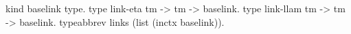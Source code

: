 \begin{elpicode}
  kind baselink type.
  type link-eta  tm -> tm -> baselink.
  type link-llam tm -> tm -> baselink.
  typeabbrev links (list (inctx baselink)).
\end{elpicode}

